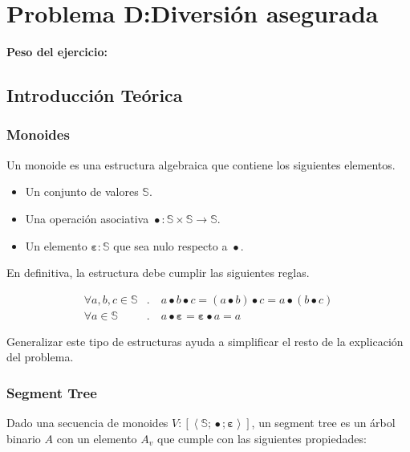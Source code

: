 \newpage{}
\section{Problema D:\@ Diversión asegurada}
\textbf{Peso del ejercicio: }

\newcommand{\mappend}{\operatorname{\bullet}}
\newcommand{\mempty}{\mathbf{\varepsilon}}

\subsection{Introducción Teórica}

\subsubsection{Monoides}

Un monoide es una estructura algebraica que contiene los siguientes elementos.

\begin{itemize}
	\item Un conjunto de valores \(\mathbb{S}\).
	\item Una operación asociativa \(\mappend : \mathbb{S} \times \mathbb{S} \rightarrow \mathbb{S}\).
	\item Un elemento \(\mempty : \mathbb{S}\) que sea nulo respecto a \(\mappend\).
\end{itemize}

En definitiva, la estructura debe cumplir las siguientes reglas.

\[
\begin{aligned}
	\forall a, b, c \in \mathbb{S}&. \quad a \mappend b \mappend c = (a \mappend b) \mappend c = a \mappend (b \mappend c) \\
	\forall a \in \mathbb{S}&. \quad a \mappend \mempty = \mempty \mappend a = a
\end{aligned}
\]

Generalizar este tipo de estructuras ayuda a simplificar el resto de la explicación del problema.

\subsubsection{Segment Tree}

Dado una secuencia de monoides \(V : \left[\left<\mathbb{S}; \mappend; \mempty\right>\right]\), un segment tree es un árbol binario \(A\) con un elemento \(A_v\) que cumple con las siguientes propiedades:

